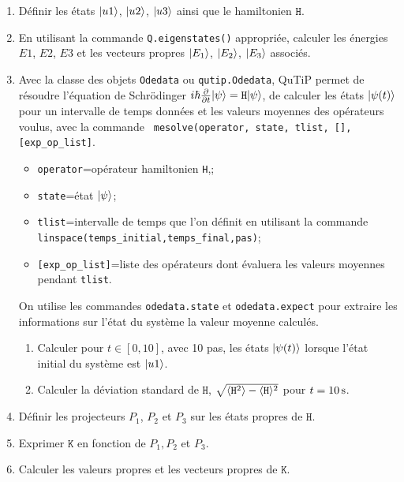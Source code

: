 {\begin{enumerate}
\item Définir les états $\vert u1\rangle$, $\vert u2\rangle$, $\vert u3\rangle$ ainsi que le 
hamiltonien $\mathtt{H}$.

\item En utilisant la commande \texttt{Q.eigenstates()} appropriée, calculer 
les énergies $E1$, $E2$, $E3$ et les vecteurs propres $\vert E_1\rangle$, $\vert E_2\rangle$, 
$\vert E_3\rangle$ associés.

\item Avec la classe des objets \texttt{Odedata} ou \texttt{qutip.Odedata}, 
QuTiP permet de résoudre l'équation de Schr\"odinger 
$i\hbar\frac{\partial}{\partial t}\vert\psi\rangle=\mathtt{H}\vert\psi\rangle$, de calculer 
les états $\vert\psi(t)\rangle$ pour un intervalle de temps données et les valeurs 
moyennes des opérateurs voulus, avec la commande 
\texttt{ mesolve(operator, state, tlist, [], [exp_op_list]}.
\begin{itemize}
\item \texttt{operator}=opérateur hamiltonien \texttt{H},;
\item \texttt{state}=état $\vert\psi\rangle$;
\item \texttt{tlist}=intervalle de temps que l'on définit en utilisant la 
commande \texttt{linspace(temps_initial,temps_final,pas)};
\item \texttt{[exp_op_list]}=liste des opérateurs dont évaluera les valeurs 
moyennes pendant \texttt{tlist}.
\end{itemize}
On utilise les commandes \texttt{odedata.state} et \texttt{odedata.expect} pour 
extraire les informations sur l'état du système la valeur moyenne calculés.
\begin{enumerate}
\item Calculer pour $t\in[0,10]$, avec 10 pas, les états $\vert\psi(t)\rangle$ 
lorsque l'état initial du système est $\vert u1\rangle$.

\item Calculer la déviation standard de $\mathtt{H}$, 
$\sqrt{\langle{\mathtt{H}^2}\rangle-\langle{\mathtt{H}}\rangle^2}$ pour $t=10\operatorname{s}$.
\end{enumerate}

\item Définir les projecteurs $P_1$, $P_2$ et $P_3$ sur les états propres de 
$\mathtt{H}$.

\item Exprimer $\mathtt{K}$ en fonction de $P_1,P_2$ et $P_3$.

\item Calculer les valeurs propres et les vecteurs propres de $\mathtt{K}$.


\end{enumerate}}
